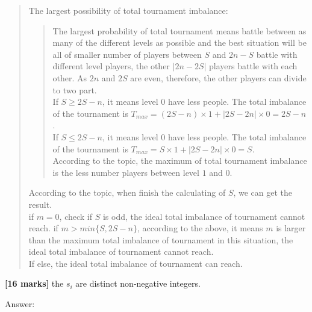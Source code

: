 \documentclass{article}
\begin{document}
\begin{Question}
\begin{Subquestion}
\begin{answer}
\begin{quote}
\begin{quote}
\end{quote}
    The largest possibility of total tournament imbalance:
    \begin{quote}
        The largest probability of total tournament means battle between as many of the different levels as possible and the best situation will be all of smaller number of players between $S$ and $2n-S$ battle with different level players, the other $| 2n-2S |$ players battle with each other. As $2n$ and $2S$ are even, therefore, the other players can divide to two part.\\
        If $S\geq2S-n$, it means level $0$ have less people. The total imbalance of the tournament is $T_{max} = (2S-n) \times 1 + | 2S-2n | \times 0 = 2S-n$.\\
        If $S\leq2S-n$, it means level $0$ have less people. The total imbalance of the tournament is $T_{max} = S \times 1 + | 2S-2n | \times 0 = S$.\\ 
        According to the topic, the maximum of total tournament imbalance is the less number players between level $1$ and $0$.
    \end{quote}
    According to the topic, when finish the calculating of $S$, we can get the result.\\
    if $m=0$, check if $S$ is odd, the ideal total imbalance of tournament cannot reach.
    if $m > min \{ S, 2S-n \}$, according to the above, it means $m$ is larger than the maximum total imbalance of tournament in this situation,  the ideal total imbalance of tournament cannot reach.\\
    If else, the ideal total imbalance of tournament can reach.\\
    
\end{quote}
\end{answer}
\end{Subquestion}

\begin{Subquestion}
\textbf{[16 marks]} the $s_i$ are distinct non-negative integers.

\begin{answer}
Answer:
\begin{quote}
    
\end{quote}
\end{answer}
\end{Subquestion}
\end{Question}
\end{document}
